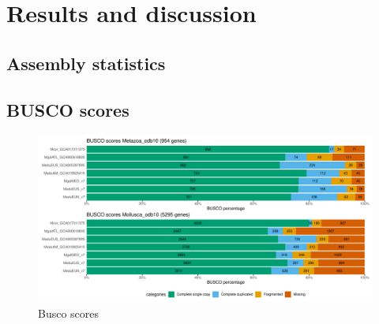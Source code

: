 \documentclass[11pt, a4paper]{article}
\begin{document}


\section{Results and discussion}




\subsection{Assembly statistics}

\begin{landscape}
	
\end{landscape}

\subsection{BUSCO scores}

\begin{figure}[h]
	\includegraphics[width=\linewidth]{figures/Fig2_busco.pdf}
	\caption{Busco scores}
	\label{fig:busco}
\end{figure}
\end{document}
